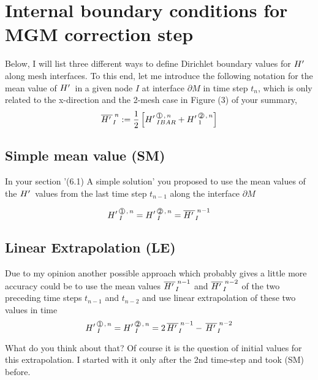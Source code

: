 \section{Internal boundary conditions for MGM correction step}


Below, I will list three different ways to define Dirichlet boundary values for ${H'\,}$ along mesh interfaces.
To this end, let me introduce the following notation for the mean value of ${H'\,}$ in a given node $I$  
at interface $\partial M$ in time step $t_n$, which is only related to the x-direction and the 2-mesh case in Figure (3) of your summary,
\begin{equation}
\label{BC-MEAN}
\HLO{I}{n}:=  \frac{1}{2} \left[  \HL{IBAR}{1}{n}  +  \HL{1}{2}{n} \right] 
\end{equation}


\subsection{Simple mean value (SM)} 
In your section '(6.1) A simple solution'  you proposed to use the mean values of the ${H'\,}$ values  from the last time step $t_{n-1}$
along the interface $\partial M$

\begin{equation}
\label{BC-SM}
\HL{I}{1}{n} = \HL{I}{2}{n} = \HLO{I}{n-1}  
\end{equation}

\subsection{Linear Extrapolation (LE)}

Due to my opinion another possible approach which probably gives a little more accuracy could be to use the mean values 
$\overline{{H'\,}}_{I}^{\;{n-1}}$ and $\overline{{H'\,}}_{I}^{\;{n-2}}$ of the two preceding time steps $t_{n-1}$ and $t_{n-2}$
and use linear extrapolation of these two values in time 
\begin{equation}
\label{BC-LE}
\HL{I}{1}{n} = \HL{I}{2}{n} =  2 \,\HLO{I}{n-1} - \, \HLO{I}{n-2}
\end{equation}
  
What do you think about that? Of course it is the question of initial values for this extrapolation. I started with it only after the 2nd time-step and took (SM) before. 

